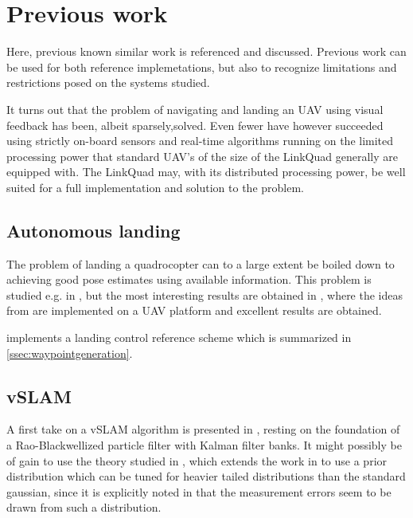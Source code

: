 \section{Previous work}
\label{sec:previouswork}
    Here, previous known similar work is referenced and discussed.
    Previous work can be used for both reference implemetations, but also to
    recognize limitations and restrictions posed on the systems studied.

    It turns out that the problem of navigating and landing an UAV using visual
    feedback has been, albeit sparsely,solved.
    Even fewer have however succeeded using strictly on-board sensors and
    real-time algorithms running on the limited processing power that standard
    UAV's of the size of the LinkQuad generally are equipped with.
    The LinkQuad may, with its distributed processing
    power, be well suited for a full implementation and solution to the problem.

    \subsection{Autonomous landing}
    The problem of landing a quadrocopter can to a large extent be boiled
    down to achieving good pose estimates using available information.
    This problem is studied e.g. in \citep{DM:MS:10,brockers:803111},
    but the most interesting results are obtained in \citep{DBLP:conf/icra/BloschWSS10,weiss11monocular},
    where the ideas from \citep{klein07parallel} are implemented on a UAV platform
    and excellent results are obtained.

    \citep{brockers:803111} implements a landing control reference scheme
    which is summarized in \ref{ssec:waypointgeneration}.

    \subsection{vSLAM}
    A first take on a vSLAM algorithm is presented in \citep{Karlsson05thevslam}, resting on the
    foundation of a Rao-Blackwellized particle filter with Kalman filter banks.
    It might possibly be of gain to use the theory studied in \citep{vandermerwe:upf},
    which extends the work in \citep{Montemerlo+al:AAAI02,Montemerlo_2003_4434} to use a prior distribution
    which can be tuned for heavier tailed distributions than the standard gaussian\citep{Merwe04sigma-pointkalman}, since
    it is explicitly noted in \citep{Karlsson05thevslam} that the measurement errors seem to
    be drawn from such a distribution.

